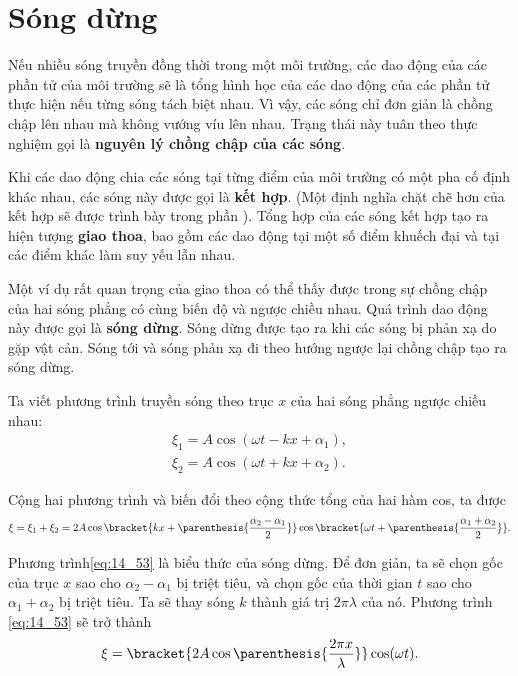 \section{Sóng dừng}\label{sec:14_7}

Nếu nhiều sóng truyền đồng thời trong một môi trường, các dao động của các phần tử của môi trường sẽ là tổng hình học của các dao động của các phần tử thực hiện nếu từng sóng tách biệt nhau. Vì vậy, các sóng chỉ đơn giản là chồng chập lên nhau mà không vướng víu lên nhau. Trạng thái này tuân theo thực nghiệm gọi là \textbf{nguyên lý chồng chập của các sóng}.

Khi các dao động chia các sóng tại từng điểm của môi trường có một pha cố định khác nhau, các sóng này được gọi là \textbf{kết hợp}. (Một định nghĩa chặt chẽ hơn của kết hợp sẽ được trình bày trong phần ). Tổng hợp của các sóng kết hợp tạo ra hiện tượng \textbf{giao thoa}, bao gồm các dao động tại một số điểm khuếch đại và tại các điểm khác làm suy yếu lẫn nhau.

Một ví dụ rất quan trọng của giao thoa có thể thấy được trong sự chồng chập của hai sóng phẳng có cùng biến độ và ngược chiều nhau. Quá trình dao động này được gọi là \textbf{sóng dừng}. Sóng dừng được tạo ra khi các sóng bị phản xạ do gặp vật cản. Sóng tới và sóng phản xạ đi theo hướng ngược lại chồng chập tạo ra sóng dừng.

Ta viết phương trình truyền sóng theo trục $x$ của hai sóng phẳng ngược chiều nhau:
\begin{align*}
	\xi_1 = A \cos(\omega t - kx + \alpha_1),\\
	\xi_2 = A \cos(\omega t + kx + \alpha_2).
\end{align*}

\noindent
Cộng hai phương trình và biến đổi theo cộng thức tổng của hai hàm cos, ta được
\begin{equation}\label{eq:14_53}
	\xi = \xi_1 + \xi_2 = 2A \cos\bracket{kx + \parenthesis{\frac{\alpha_2-\alpha_1}{2}}} \cos\bracket{\omega t + \parenthesis{\frac{\alpha_1+\alpha_2}{2}}}.
\end{equation}

\noindent
Phương trình\eqref{eq:14_53} là biểu thức của sóng dừng. Để đơn giản, ta sẽ chọn gốc của trục $x$ sao cho $\alpha_2-\alpha_1$ bị triệt tiêu, và chọn gốc của thời gian $t$ sao cho $\alpha_1+\alpha_2$ bị triệt tiêu. Ta sẽ thay sóng $k$ thành giá trị $2\pi\lambda$ của nó. Phương trình \eqref{eq:14_53} sẽ trở thành
\begin{equation}\label{eq:14_54}
	\xi = \bracket{2 A \cos\parenthesis{\frac{2\pi x}{\lambda}}} \cos(\omega t).
\end{equation}

